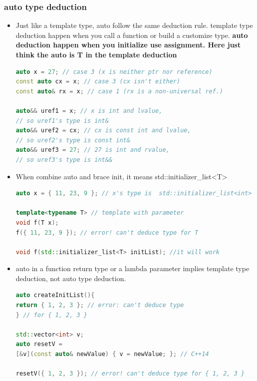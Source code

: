\documentclass[a4paper,12pt,twoside]{book}
\begin{document}
\subsubsection{auto type deduction}
\begin{itemize}
\item Just like a template type, auto follow the same deduction rule. template type deduction happen when you call a function or build a customize type. \textbf{auto deduction happen when you initialize use assignment. Here  just think the auto is T in the template deduction}

\begin{lstlisting}[frame=single, language=c++]
auto x = 27; // case 3 (x is neither ptr nor reference)
const auto cx = x; // case 3 (cx isn't either)
const auto& rx = x; // case 1 (rx is a non-universal ref.)

auto&& uref1 = x; // x is int and lvalue,
// so uref1's type is int&
auto&& uref2 = cx; // cx is const int and lvalue,
// so uref2's type is const int&
auto&& uref3 = 27; // 27 is int and rvalue,
// so uref3's type is int&&
\end{lstlisting}

\item When combine auto and brace init, it means std::initializer\_list<T>
\begin{lstlisting}[frame=single, language=c++]
auto x = { 11, 23, 9 }; // x's type is  std::initializer_list<int>

template<typename T> // template with parameter
void f(T x);
f({ 11, 23, 9 }); // error! can't deduce type for T

void f(std::initializer_list<T> initList); //it will work
\end{lstlisting}

\item auto in a function return type or a lambda parameter implies template type deduction, not auto type deduction.
\begin{lstlisting}[frame=single, language=c++]
auto createInitList(){
return { 1, 2, 3 }; // error: can't deduce type
} // for { 1, 2, 3 }

std::vector<int> v;
auto resetV =
[&v](const auto& newValue) { v = newValue; }; // C++14

resetV({ 1, 2, 3 }); // error! can't deduce type for { 1, 2, 3 }
\end{lstlisting}
\end{itemize}
\end{document}
